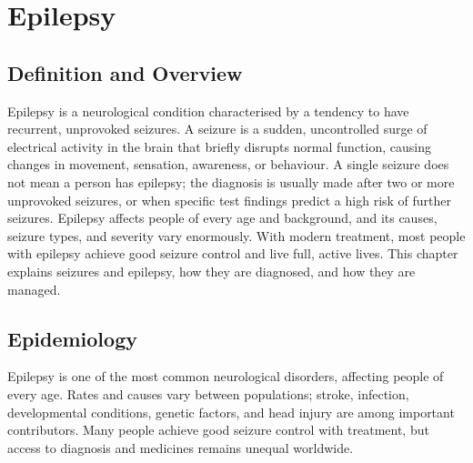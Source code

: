\chapter{Epilepsy}

\section*{Definition and Overview}
Epilepsy is a neurological condition characterised by a tendency to have recurrent, unprovoked seizures. A seizure is a sudden, uncontrolled surge of electrical activity in the brain that briefly disrupts normal function, causing changes in movement, sensation, awareness, or behaviour. A single seizure does not mean a person has epilepsy; the diagnosis is usually made after two or more unprovoked seizures, or when specific test findings predict a high risk of further seizures. Epilepsy affects people of every age and background, and its causes, seizure types, and severity vary enormously. With modern treatment, most people with epilepsy achieve good seizure control and live full, active lives. This chapter explains seizures and epilepsy, how they are diagnosed, and how they are managed.

\section*{Epidemiology}
Epilepsy is one of the most common neurological disorders, affecting people of every age. Rates and causes vary between populations; stroke, infection, developmental conditions, genetic factors, and head injury are among important contributors. Many people achieve good seizure control with treatment, but access to diagnosis and medicines remains unequal worldwide.

